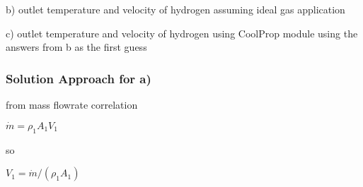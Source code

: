\documentclass[letterpaper,10pt,english]{jupyterBook}
\begin{document}
\sphinxAtStartPar
b) outlet temperature and velocity of hydrogen assuming ideal gas application

\sphinxAtStartPar
c) outlet temperature and velocity of hydrogen using CoolProp module using the answers from b as the first guess

\sphinxAtStartPar
{}


\subsubsection{Solution Approach for a)}
\label{\detokenize{notebooks/Chapter5/CH5-Q9:solution-approach-for-a}}
\sphinxAtStartPar
from mass flow\sphinxhyphen{}rate correlation

\sphinxAtStartPar
\(\dot m=\rho_1 A_1V_1\)

\sphinxAtStartPar
so

\sphinxAtStartPar
\(V_1=\dot m/(\rho_1A_1)\)
\end{document}
